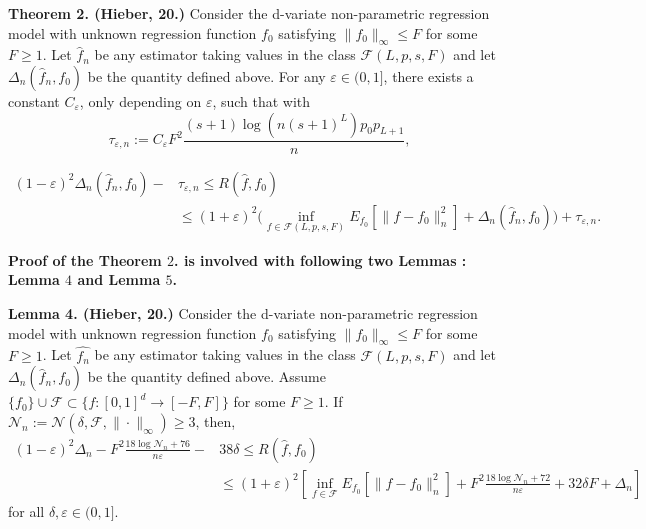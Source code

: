 \documentclass{article}
\theoremstyle{definition}
\begin{document}
\begin{tcolorbox}
\textbf{Theorem 2. (Hieber, 20.)}
Consider the d-variate non-parametric regression model with unknown regression function $f_{0}$ satisfying $\|f_{0}\|_{\infty} \leq F$ for some $F\geq 1$. Let $\widehat{f}_{n}$ be any estimator taking values in the class $\mathcal{F}(L,p,s,F)$ and let $\Delta_{n}(\widehat{f}_{n},f_{0})$ be the quantity defined above.
For any $\varepsilon \in (0,1]$, there exists a constant $C_{\varepsilon}$, only depending on $\varepsilon$, such that with 
\begin{equation*}
    \tau_{\varepsilon,n}:=C_{\varepsilon}F^{2}\frac{(s+1)\log(n(s+1)^{L})p_{0}p_{L+1}}{n}, 
\end{equation*}

\begin{align*}
    (1-\varepsilon)^{2}\Delta_{n}(\widehat{f}_{n},f_{0})- &\tau_{\varepsilon,n} \leq 
    R(\widehat{f},f_{0})  
    \\
    &\leq (1+\varepsilon)^{2}\bigg( \inf_{f \in \mathcal{F}(L,p,s,F)  }E_{f_{0}}[\|f-f_{0}\|_{n}^{2}] + \Delta_{n}(\widehat{f}_{n},f_{0})\bigg) + \tau_{\varepsilon,n}.
\end{align*} 
\end{tcolorbox}

\newpage
\centerline{\textbf{Proof of the Theorem $2$. is involved with following two Lemmas 
: Lemma $4$ and Lemma $5$.}} 

\begin{tcolorbox}
\textbf{Lemma 4. (Hieber, 20.)}
Consider the d-variate non-parametric regression model with unknown regression function $f_{0}$ satisfying $\|f_{0}\|_{\infty} \leq F$ for some $F\geq 1$. 
Let $\widehat{f_{n}}$ be any estimator taking values in the class $\mathcal{F}(L,p,s,F)$ and let $\Delta_{n}(\widehat{f}_{n},f_{0})$ be the quantity defined above.
Assume $\{f_{0}\} \cup \mathcal{F} \subset \{f : [0,1]^{d}\rightarrow{[-F,F]}\}$ for some $F\geq 1$.
If $\mathcal{N}_{n}:=\mathcal{N}(\delta,\mathcal{F},\|\cdot\|_{\infty})\geq 3$, then, 
\begin{align*}
    (1-\varepsilon)^{2}\Delta_{n}-F^{2}\frac{18\log\mathcal{N}_{n}+76}{n\varepsilon} - & 38\delta \leq R(\widehat{f},f_{0}) \\
    &\leq (1+\varepsilon)^{2}\left[ \inf_{f \in \mathcal{F} }E_{f_{0}}[\|f-f_{0}\|_{n}^{2}] + F^{2}\frac{ 18\log\mathcal{N}_{n}+72 }{n\varepsilon}+32\delta F + \Delta_{n} \right]
\end{align*}
for all $\delta,\varepsilon \in (0,1]$.
\end{tcolorbox}
\end{document}
